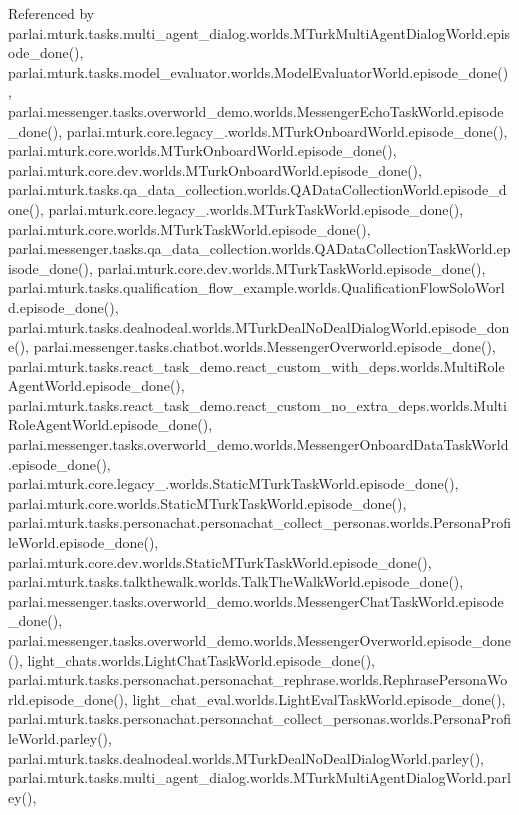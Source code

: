 Referenced by parlai.\+mturk.\+tasks.\+multi\+\_\+agent\+\_\+dialog.\+worlds.\+M\+Turk\+Multi\+Agent\+Dialog\+World.\+episode\+\_\+done(), parlai.\+mturk.\+tasks.\+model\+\_\+evaluator.\+worlds.\+Model\+Evaluator\+World.\+episode\+\_\+done(), parlai.\+messenger.\+tasks.\+overworld\+\_\+demo.\+worlds.\+Messenger\+Echo\+Task\+World.\+episode\+\_\+done(), parlai.\+mturk.\+core.\+legacy\+\_.\+worlds.\+M\+Turk\+Onboard\+World.\+episode\+\_\+done(), parlai.\+mturk.\+core.\+worlds.\+M\+Turk\+Onboard\+World.\+episode\+\_\+done(), parlai.\+mturk.\+core.\+dev.\+worlds.\+M\+Turk\+Onboard\+World.\+episode\+\_\+done(), parlai.\+mturk.\+tasks.\+qa\+\_\+data\+\_\+collection.\+worlds.\+Q\+A\+Data\+Collection\+World.\+episode\+\_\+done(), parlai.\+mturk.\+core.\+legacy\+\_.\+worlds.\+M\+Turk\+Task\+World.\+episode\+\_\+done(), parlai.\+mturk.\+core.\+worlds.\+M\+Turk\+Task\+World.\+episode\+\_\+done(), parlai.\+messenger.\+tasks.\+qa\+\_\+data\+\_\+collection.\+worlds.\+Q\+A\+Data\+Collection\+Task\+World.\+episode\+\_\+done(), parlai.\+mturk.\+core.\+dev.\+worlds.\+M\+Turk\+Task\+World.\+episode\+\_\+done(), parlai.\+mturk.\+tasks.\+qualification\+\_\+flow\+\_\+example.\+worlds.\+Qualification\+Flow\+Solo\+World.\+episode\+\_\+done(), parlai.\+mturk.\+tasks.\+dealnodeal.\+worlds.\+M\+Turk\+Deal\+No\+Deal\+Dialog\+World.\+episode\+\_\+done(), parlai.\+messenger.\+tasks.\+chatbot.\+worlds.\+Messenger\+Overworld.\+episode\+\_\+done(), parlai.\+mturk.\+tasks.\+react\+\_\+task\+\_\+demo.\+react\+\_\+custom\+\_\+with\+\_\+deps.\+worlds.\+Multi\+Role\+Agent\+World.\+episode\+\_\+done(), parlai.\+mturk.\+tasks.\+react\+\_\+task\+\_\+demo.\+react\+\_\+custom\+\_\+no\+\_\+extra\+\_\+deps.\+worlds.\+Multi\+Role\+Agent\+World.\+episode\+\_\+done(), parlai.\+messenger.\+tasks.\+overworld\+\_\+demo.\+worlds.\+Messenger\+Onboard\+Data\+Task\+World.\+episode\+\_\+done(), parlai.\+mturk.\+core.\+legacy\+\_.\+worlds.\+Static\+M\+Turk\+Task\+World.\+episode\+\_\+done(), parlai.\+mturk.\+core.\+worlds.\+Static\+M\+Turk\+Task\+World.\+episode\+\_\+done(), parlai.\+mturk.\+tasks.\+personachat.\+personachat\+\_\+collect\+\_\+personas.\+worlds.\+Persona\+Profile\+World.\+episode\+\_\+done(), parlai.\+mturk.\+core.\+dev.\+worlds.\+Static\+M\+Turk\+Task\+World.\+episode\+\_\+done(), parlai.\+mturk.\+tasks.\+talkthewalk.\+worlds.\+Talk\+The\+Walk\+World.\+episode\+\_\+done(), parlai.\+messenger.\+tasks.\+overworld\+\_\+demo.\+worlds.\+Messenger\+Chat\+Task\+World.\+episode\+\_\+done(), parlai.\+messenger.\+tasks.\+overworld\+\_\+demo.\+worlds.\+Messenger\+Overworld.\+episode\+\_\+done(), light\+\_\+chats.\+worlds.\+Light\+Chat\+Task\+World.\+episode\+\_\+done(), parlai.\+mturk.\+tasks.\+personachat.\+personachat\+\_\+rephrase.\+worlds.\+Rephrase\+Persona\+World.\+episode\+\_\+done(), light\+\_\+chat\+\_\+eval.\+worlds.\+Light\+Eval\+Task\+World.\+episode\+\_\+done(), parlai.\+mturk.\+tasks.\+personachat.\+personachat\+\_\+collect\+\_\+personas.\+worlds.\+Persona\+Profile\+World.\+parley(), parlai.\+mturk.\+tasks.\+dealnodeal.\+worlds.\+M\+Turk\+Deal\+No\+Deal\+Dialog\+World.\+parley(), parlai.\+mturk.\+tasks.\+multi\+\_\+agent\+\_\+dialog.\+worlds.\+M\+Turk\+Multi\+Agent\+Dialog\+World.\+parley(), 
